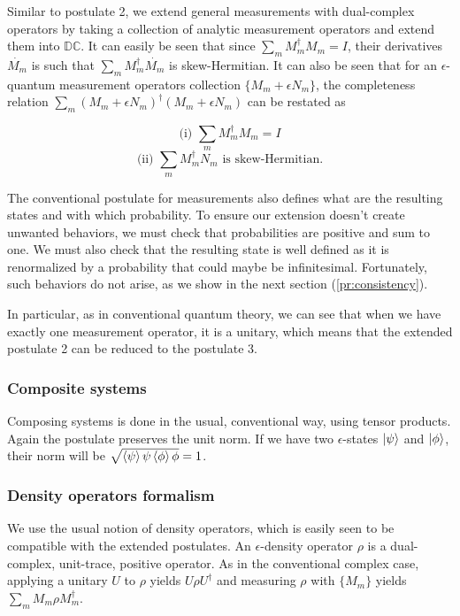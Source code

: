\documentclass{article}
\newcommand{\DC}{\mathbb{DC}}
\newcommand{\e}{\epsilon}
\begin{document}
Similar to postulate 2, we extend general measurements with dual-complex operators by taking a collection of analytic measurement operators and extend them into $\DC$. It can easily be seen that since $\sum_m M_m^\dagger M_m = I$, their derivatives $\dot{M_m}$ is such that $\sum_m M_m^\dagger \dot{M_m}$ is skew-Hermitian. It can also be seen that for an $\e$-quantum measurement operators collection $\{M_m + \e N_m\}$, the completeness relation $\sum_m (M_m + \e N_m)^\dagger (M_m + \e N_m)$ can be restated as

\begin{multicols}{2}
\noindent \begin{equation}
 \text{(i) } \sum_m M_m^\dagger M_m = I
\end{equation}
\columnbreak
\noindent \begin{equation}
 \text{(ii) } \sum_m M_m^\dagger N_m \text{ is skew-Hermitian.}
\end{equation}
\end{multicols}

The conventional postulate for measurements also defines what are the resulting states and with which probability. To ensure our extension doesn't create unwanted behaviors, we must check that probabilities are positive and sum to one. We must also check that the resulting state is well defined as it is renormalized by a probability that could maybe be infinitesimal. Fortunately, such behaviors do not arise, as we show in the next section (\ref{pr:consistency}).

In particular, as in conventional quantum theory, we can see that when we have exactly one measurement operator, it is a unitary, which means that the extended postulate 2 can be reduced to the postulate 3.

\subsubsection*{Composite systems}

Composing systems is done in the usual, conventional way, using tensor products. Again the postulate preserves the unit norm. If we have two $\e$-states $\ket\psi$ and $\ket\phi$, their norm will be $\sqrt{\braket\psi\psi \braket\phi\phi} = 1$.

\subsubsection*{Density operators formalism}

We use the usual notion of density operators, which is easily seen to be compatible with the extended postulates. An $\e$-density operator $\rho$ is a dual-complex, unit-trace, positive operator. As in the conventional complex case, applying a unitary $U$ to $\rho$ yields $U \rho U^\dagger$ and measuring $\rho$ with $\{M_m\}$ yields $\sum_m M_m \rho M_m^\dagger$.
\end{document}
